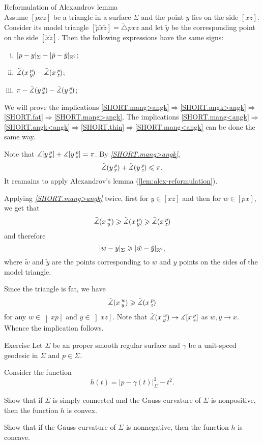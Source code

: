 \begin{thm}{Reformulation of Alexandrov lemma}\label{lem:alex-reformulation}\\
Assume $[pxz]$ be a triangle in a surface $\Sigma$ and 
the point $y$ lies on the side $[xz]$.
Consider its model triangle $[\tilde p\tilde x\tilde z]=\tilde\triangle pxz$ and let $\tilde y$ be the corresponding point on the side $[\tilde x\tilde z]$.
Then the following expressions have the same signs:
\begin{enumerate}[(i)]
 \item $|p-y|_\Sigma-|\tilde p-\tilde y|_{\mathbb{R}^2}$;
 \item $\tilde\measuredangle(x\,{}^{p}_{y}\hspace{-0.2ex})-\tilde\measuredangle(x\,{}^{p}_{z}\hspace{-0.2ex})$;
 \item $\pi-\tilde\measuredangle(y\,{}^{p}_{x}\hspace{-0.2ex})-\tilde\measuredangle(y\,{}^{p}_{z}\hspace{-0.2ex})$;
\end{enumerate}
\end{thm}

We will prove the implications \ref{SHORT.mang>angk}$\Rightarrow$\ref{SHORT.angk>angk}$\Rightarrow$\ref{SHORT.fat}$\Rightarrow$\ref{SHORT.mang>angk}.
The implications \ref{SHORT.mang<angk}$\Rightarrow$\ref{SHORT.angk<angk}$\Rightarrow$\ref{SHORT.thin}$\Rightarrow$\ref{SHORT.mang<angk} can be done the same way.

Note that $\measuredangle[y\,{}^{p}_{x}]+\measuredangle[y\,{}^{p}_{z}]=\pi$.
By \textit{\ref{SHORT.mang>angk}}, 
\[\tilde\measuredangle(y\,{}^{p}_{x}\hspace{-0.2ex})+\tilde\measuredangle(y\,{}^{p}_{z}\hspace{-0.2ex})\leqslant \pi.\]
It reamains to apply Alexandrov's lemma (\ref{lem:alex-reformulation}).


Applying \textit{\ref{SHORT.mang>angk}} twice, first for $y\in [xz]$ and then for $w\in [px]$, we get that
\[\tilde\measuredangle(x\,{}^{w}_{y}\hspace{-0.2ex}) \geqslant \tilde\measuredangle(x\,{}^{p}_{y}\hspace{-0.2ex}) \geqslant \tilde\measuredangle(x\,{}^{p}_{z}\hspace{-0.2ex})\]
and therefore
\[|w-y|_\Sigma\geqslant |\tilde w-\tilde y|_{\mathbb{R}^2},\]
where $\tilde w$ and $\tilde y$ are the points corresponding to $w$ and $y$ points on the sides of the model triangle. 

Since the triangle is fat, we have 
\[\tilde\measuredangle(x\,{}^{w}_{y}\hspace{-0.2ex}) \geqslant \tilde\measuredangle(x\,{}^{p}_{z}\hspace{-0.2ex})\]
for any $w\in \left]xp\right]$ and $y\in \left]xz\right]$.
Note that $\tilde\measuredangle(x\,{}^{w}_{y}\hspace{-0.2ex})\to \measuredangle[x\,{}^{p}_{z}]$ as $w,y\to x$.
Whence the implication follows.
\qeds

\begin{thm}{Exercise}\label{ex:geod-convexity}
Let $\Sigma$ be an proper smooth regular surface
and $\gamma$ be a unit-speed geodesic in $\Sigma$ and $p\in\Sigma$.

Consider the function
\[h(t)=|p-\gamma(t)|_\Sigma^2-t^2.\]

\begin{subthm}{}
Show that if $\Sigma$ is simply connected and the Gauss curvature of $\Sigma$ is nonpositive, then the function $h$ is convex.
\end{subthm}

\begin{subthm}{} Show that if the Gauss curvature of $\Sigma$ is nonnegative, then the function $h$ is concave.
\end{subthm}

\end{thm}


